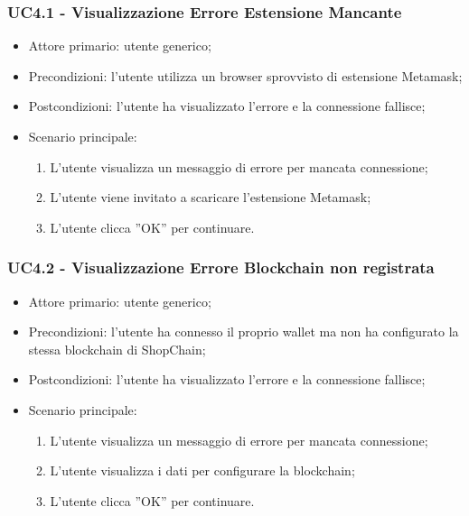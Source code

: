 \subsubsection{UC4.1 - Visualizzazione Errore Estensione Mancante}

\begin{itemize}
    \item Attore primario: utente generico;
    \item Precondizioni: l'utente utilizza un browser sprovvisto di estensione Metamask\glo{};
    \item Postcondizioni: l'utente ha visualizzato l'errore e la connessione fallisce;
    \item Scenario principale:
          \begin{enumerate}
              \item L'utente visualizza un messaggio di errore per mancata connessione;
              \item L'utente viene invitato a scaricare l'estensione Metamask\glo{};
              \item L'utente clicca ”OK” per continuare.
          \end{enumerate}
\end{itemize}

\subsubsection{UC4.2 - Visualizzazione Errore Blockchain non registrata}

\begin{itemize}
    \item Attore primario: utente generico;
    \item Precondizioni: l'utente ha connesso il proprio wallet\glo{} ma non ha configurato la stessa blockchain\glo{} di ShopChain;
    \item Postcondizioni: l'utente ha visualizzato l'errore e la connessione fallisce;
    \item Scenario principale:
          \begin{enumerate}
              \item L'utente visualizza un messaggio di errore per mancata connessione;
              \item L'utente visualizza i dati per configurare la blockchain\glo{};
              \item L'utente clicca ”OK” per continuare.
          \end{enumerate}
\end{itemize}

